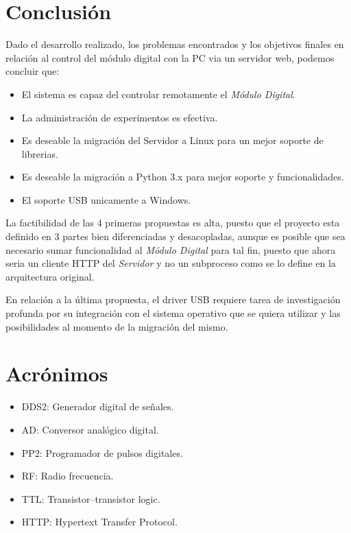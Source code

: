 \section{Conclusi\'on}

Dado el desarrollo realizado, los problemas encontrados y los objetivos finales en relaci\'on
al control del m\'odulo digital con la PC via un servidor web, podemos concluir que:

\begin{itemize}
    \item El sistema es capaz del controlar remotamente el \textit{M\'odulo Digital}.
    \item La administraci\'on de experimentos es efectiva.
    \item Es deseable la migraci\'on del Servidor a Linux para un mejor soporte de librerias.
    \item Es deseable la migraci\'on a Python 3.x para mejor soporte y funcionalidades.
    \item El soporte USB unicamente a Windows.
\end{itemize}

La factibilidad de las 4 primeras propuestas es alta, puesto que el proyecto esta definido en 3 partes
bien diferenciadas y desacopladas, aunque es posible que sea necesario sumar funcionalidad 
al \textit{M\'odulo Digital} para tal fin, puesto que ahora seria un cliente HTTP del \textit{Servidor} y
no un subproceso como se lo define en la arquitectura original.

En relaci\'on a la \'ultima propuesta, el driver USB requiere tarea de investigaci\'on profunda por su integraci\'on con el
sistema operativo que se quiera utilizar y las posibilidades al momento de la migraci\'on del mismo.

\newpage

\section{Acr\'onimos}

\begin{itemize}
    \item DDS2: Generador digital de se\~nales.
    \item AD: Conversor anal\'ogico digital.
    \item PP2: Programador de pulsos digitales.
    \item RF: Radio frecuencia.
    \item TTL: Transistor–transistor logic.
    \item HTTP: Hypertext Transfer Protocol.
\end{itemize}

\newpage